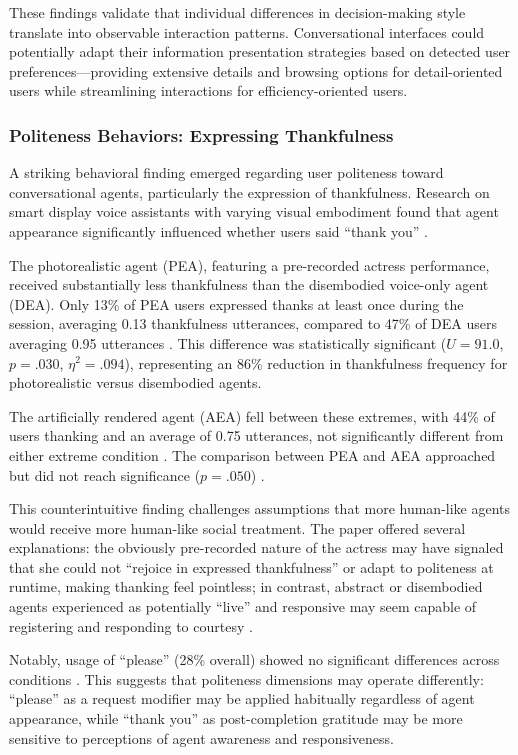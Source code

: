 \documentclass[manuscript,anonymous,sigconf]{acmart}
\begin{document}
These findings validate that individual differences in decision-making style translate into observable interaction patterns. Conversational interfaces could potentially adapt their information presentation strategies based on detected user preferences---providing extensive details and browsing options for detail-oriented users while streamlining interactions for efficiency-oriented users.

\subsubsection{Politeness Behaviors: Expressing Thankfulness}

A striking behavioral finding emerged regarding user politeness toward conversational agents, particularly the expression of thankfulness. Research on smart display voice assistants with varying visual embodiment found that agent appearance significantly influenced whether users said ``thank you'' \cite{A86}.

The photorealistic agent (PEA), featuring a pre-recorded actress performance, received substantially less thankfulness than the disembodied voice-only agent (DEA). Only 13\% of PEA users expressed thanks at least once during the session, averaging 0.13 thankfulness utterances, compared to 47\% of DEA users averaging 0.95 utterances \cite{A86}. This difference was statistically significant ($U = 91.0$, $p = .030$, $\eta^2 = .094$), representing an 86\% reduction in thankfulness frequency for photorealistic versus disembodied agents.

The artificially rendered agent (AEA) fell between these extremes, with 44\% of users thanking and an average of 0.75 utterances, not significantly different from either extreme condition \cite{A86}. The comparison between PEA and AEA approached but did not reach significance ($p = .050$) \cite{A86}.

This counterintuitive finding challenges assumptions that more human-like agents would receive more human-like social treatment. The paper offered several explanations: the obviously pre-recorded nature of the actress may have signaled that she could not ``rejoice in expressed thankfulness'' or adapt to politeness at runtime, making thanking feel pointless; in contrast, abstract or disembodied agents experienced as potentially ``live'' and responsive may seem capable of registering and responding to courtesy \cite{A86}.

Notably, usage of ``please'' (28\% overall) showed no significant differences across conditions \cite{A86}. This suggests that politeness dimensions may operate differently: ``please'' as a request modifier may be applied habitually regardless of agent appearance, while ``thank you'' as post-completion gratitude may be more sensitive to perceptions of agent awareness and responsiveness.
\end{document}
